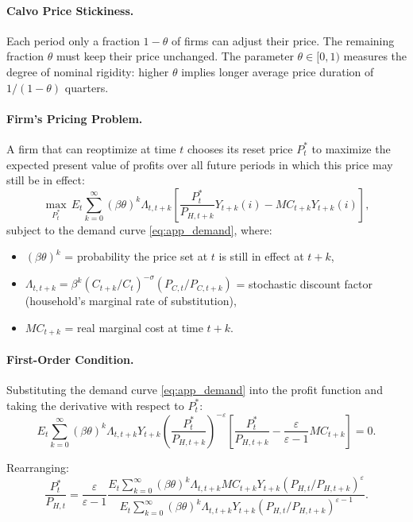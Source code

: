 \documentclass[12pt,a4paper]{article}
\begin{document}
\begin{appendices}
\paragraph{Calvo Price Stickiness.}
Each period only a fraction $1-\theta$ of firms can adjust their price. The remaining fraction $\theta$ must keep their price unchanged. The parameter $\theta \in [0,1)$ measures the degree of nominal rigidity: higher $\theta$ implies longer average price duration of $1/(1-\theta)$ quarters.

\paragraph{Firm's Pricing Problem.}
A firm that can reoptimize at time $t$ chooses its reset price $P_t^*$ to maximize the expected present value of profits over all future periods in which this price may still be in effect:
\begin{equation}
	\max_{P_t^*} \, E_t \sum_{k=0}^\infty (\beta\theta)^k \Lambda_{t,t+k} \left[ \frac{P_t^*}{P_{H,t+k}} Y_{t+k}(i) - MC_{t+k} Y_{t+k}(i) \right],
	\label{eq:app_firm_profit}
\end{equation}
subject to the demand curve \eqref{eq:app_demand}, where:
\begin{itemize}
	\item $(\beta\theta)^k$ = probability the price set at $t$ is still in effect at $t+k$,
	\item $\Lambda_{t,t+k} = \beta^k (C_{t+k}/C_t)^{-\sigma} (P_{C,t}/P_{C,t+k})$ = stochastic discount factor (household's marginal rate of substitution),
	\item $MC_{t+k}$ = real marginal cost at time $t+k$.
\end{itemize}

\paragraph{First-Order Condition.}
Substituting the demand curve \eqref{eq:app_demand} into the profit function and taking the derivative with respect to $P_t^*$:
\begin{equation}
	E_t \sum_{k=0}^\infty (\beta\theta)^k \Lambda_{t,t+k} Y_{t+k} \left(\frac{P_t^*}{P_{H,t+k}}\right)^{-\varepsilon} \left[ \frac{P_t^*}{P_{H,t+k}} - \frac{\varepsilon}{\varepsilon-1} MC_{t+k} \right] = 0.
	\label{eq:app_foc_firm}
\end{equation}

Rearranging:
\begin{equation}
	\frac{P_t^*}{P_{H,t}} = \frac{\varepsilon}{\varepsilon-1} \frac{E_t \sum_{k=0}^\infty (\beta\theta)^k \Lambda_{t,t+k} MC_{t+k} Y_{t+k} (P_{H,t}/P_{H,t+k})^{\varepsilon}}
	{E_t \sum_{k=0}^\infty (\beta\theta)^k \Lambda_{t,t+k} Y_{t+k} (P_{H,t}/P_{H,t+k})^{\varepsilon-1}}.
	\label{eq:app_optimal_price}
\end{equation}


\end{appendices}
\end{document}
